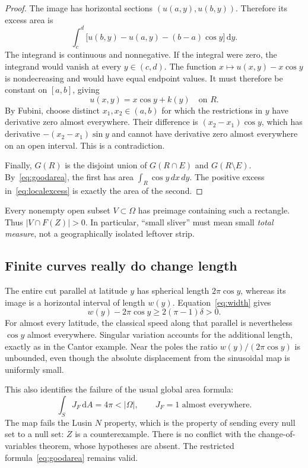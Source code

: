 \documentclass[11pt,letterpaper]{article}
\numberwithin{equation}{section}
\theoremstyle{remark}
\newcommand{\dd}{\,\mathrm d}
\begin{document}
\begin{proof}
The image has horizontal sections $(u(a,y),u(b,y))$. Therefore its excess area is
\begin{equation}\label{eq:localexcess}
 \int_c^d\bigl[u(b,y)-u(a,y)-(b-a)\cos y\bigr]\dd y.
\end{equation}
The integrand is continuous and nonnegative. If the integral were zero, the integrand would vanish at every $y\in(c,d)$. The function $x\mapsto u(x,y)-x\cos y$ is nondecreasing and would have equal endpoint values. It must therefore be constant on $[a,b]$, giving
\[
 u(x,y)=x\cos y+k(y)\quad\text{on }R.
\]
By Fubini, choose distinct $x_1,x_2\in(a,b)$ for which the restrictions in $y$ have derivative zero almost everywhere. Their difference is $(x_2-x_1)\cos y$, which has derivative $-(x_2-x_1)\sin y$ and cannot have derivative zero almost everywhere on an open interval. This is a contradiction.

Finally, $G(R)$ is the disjoint union of $G(R\cap E)$ and $G(R\setminus E)$. By~\eqref{eq:goodarea}, the first has area $\int_R\cos y\,dx\,dy$. The positive excess in~\eqref{eq:localexcess} is exactly the area of the second.
\end{proof}

Every nonempty open subset $V\subset\Omega$ has preimage containing such a rectangle. Thus $|V\cap F(Z)|>0$. In particular, ``small sliver'' must mean small \emph{total measure}, not a geographically isolated leftover strip.

\subsection{Finite curves really do change length}

The entire cut parallel at latitude $y$ has spherical length $2\pi\cos y$, whereas its image is a horizontal interval of length $w(y)$. Equation~\eqref{eq:width} gives
\[
 w(y)-2\pi\cos y\ge2(\pi-1)\delta>0.
\]
For almost every latitude, the classical speed along that parallel is nevertheless $\cos y$ almost everywhere. Singular variation accounts for the additional length, exactly as in the Cantor example. Near the poles the ratio $w(y)/(2\pi\cos y)$ is unbounded, even though the absolute displacement from the sinusoidal map is uniformly small.

This also identifies the failure of the usual global area formula:
\[
 \int_S J_F\dd A=4\pi<|\Omega|,
 \qquad J_F=1\text{ almost everywhere}.
\]
The map fails the Lusin $N$ property, which is the property of sending every null set to a null set: $Z$ is a counterexample. There is no conflict with the change-of-variables theorem, whose hypotheses are absent. The restricted formula~\eqref{eq:goodarea} remains valid.
\end{document}
